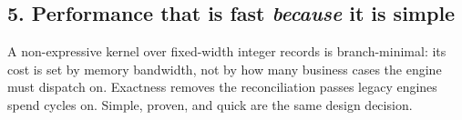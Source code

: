 \subsection{5. Performance that is fast \emph{because} it is simple}
A non-expressive kernel over fixed-width integer records is branch-minimal: its
cost is set by memory bandwidth, not by how many business cases the engine must
dispatch on. Exactness removes the reconciliation passes legacy engines spend
cycles on. Simple, proven, and quick are the same design decision.
